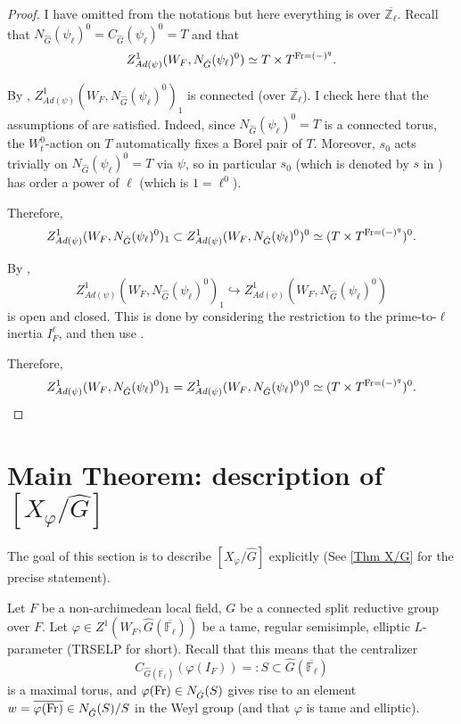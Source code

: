 \begin{proof}
	I have omitted from the notations but here everything is over $\overline{\mathbb{Z}_{\ell}}$.
	Recall that $N_{\hat{G}}(\psi_{\ell})^0=C_{\hat{G}}(\psi_{\ell})^0=T$ and that
	$$Z^1_{Ad(\psi)}(W_F, N_{\hat{G}}(\psi_{\ell})^0) \simeq T \times T^{\operatorname{Fr}=(-)^q}.$$
	
	By \cite[Section 5.4, 5.5]{dat2022ihes}, $Z^1_{Ad(\psi)}(W_F, N_{\hat{G}}(\psi_{\ell})^0)_1$ is connected (over $\overline{\mathbb{Z}_{\ell}}$). I check here that the assumptions of \cite[Section 5.4, 5.5]{dat2022ihes} are satisfied. Indeed, since $N_{\hat{G}}(\psi_{\ell})^0=T$ is a connected torus, the $W_t^0$-action on $T$ automatically fixes a Borel pair of $T$. Moreover, $s_0$ acts trivially on $N_{\hat{G}}(\psi_{\ell})^0=T$ via $\psi$, so in particular $s_0$ (which is denoted by $s$ in \cite[Section 5.5]{dat2022ihes}) has order a power of $\ell$ (which is $1 = \ell^0$).
	
	Therefore, 
	$$Z^1_{Ad(\psi)}(W_F, N_{\hat{G}}(\psi_{\ell})^0)_1 \subset Z^1_{Ad(\psi)}(W_F, N_{\hat{G}}(\psi_{\ell})^0)^0 \simeq (T \times T^{\operatorname{Fr}=(-)^q})^0.$$
	
	By \cite[Section 4.6]{dat2022ihes}, 
	$$Z^1_{Ad(\psi)}(W_F, N_{\hat{G}}(\psi_{\ell})^0)_1 \hookrightarrow Z^1_{Ad(\psi)}(W_F, N_{\hat{G}}(\psi_{\ell})^0)$$
	is open and closed. This is done by considering the restriction to the prime-to-$\ell$ inertia $I_F^{\ell}$, and then use \cite[Theorem 4.2]{dat2022ihes}.
	
	Therefore, 
	$$Z^1_{Ad(\psi)}(W_F, N_{\hat{G}}(\psi_{\ell})^0)_1 = Z^1_{Ad(\psi)}(W_F, N_{\hat{G}}(\psi_{\ell})^0)^0 \simeq (T \times T^{\operatorname{Fr}=(-)^q})^0.$$
	
\end{proof}




\section{Main Theorem: description of $[X_{\varphi}/\hat{G}]$}\label{Section X/hatG}

The goal of this section is to describe $[X_{\varphi}/\hat{G}]$ explicitly (See \ref{Thm X/G} for the precise statement).

Let $F$ be a non-archimedean local field, $G$ be a connected split reductive group over $F$. Let $\varphi \in Z^1(W_F, \hat{G}(\overline{\mathbb{F}_{\ell}}))$ be a tame, regular semisimple, elliptic $L$-parameter (TRSELP for short). Recall that this means that the centralizer 
$$C_{\hat{G}(\overline{\mathbb{F}_{\ell}})}(\varphi(I_F)) =: S \subset \hat{G}(\overline{\mathbb{F}_{\ell}})$$ 
is a maximal torus, and $\varphi(\operatorname{Fr}) \in N_{\hat{G}}(S)$ gives rise to an element $w=\overline{\varphi(\operatorname{Fr})} \in N_{\hat{G}}(S)/S$ in the Weyl group (and that $\varphi$ is tame and elliptic). 


